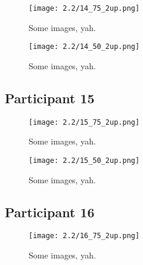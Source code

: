 \begin{figure}[h]
	\begin{center}
	\texttt{[image: 2.2/14\_75\_2up.png]}
	\caption{Some images, yah.}
	\end{center}
\end{figure}

\clearpage

\begin{figure}[h]
	\begin{center}
	\texttt{[image: 2.2/14\_50\_2up.png]}
	\caption{Some images, yah.}
	\end{center}
\end{figure}


\clearpage

\subsection{Participant 15}

\begin{figure}[h]
	\begin{center}
	\texttt{[image: 2.2/15\_75\_2up.png]}
	\caption{Some images, yah.}
	\end{center}
\end{figure}

\clearpage

\begin{figure}[h]
	\begin{center}
	\texttt{[image: 2.2/15\_50\_2up.png]}
	\caption{Some images, yah.}
	\end{center}
\end{figure}


\clearpage

\subsection{Participant 16}

\begin{figure}[h]
	\begin{center}
	\texttt{[image: 2.2/16\_75\_2up.png]}
	\caption{Some images, yah.}
	\end{center}
\end{figure}

